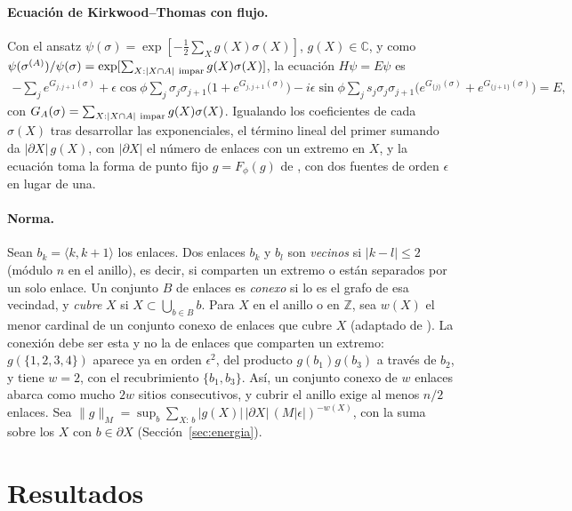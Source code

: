 \documentclass[11pt,a4paper]{article}
\theoremstyle{remark}
\begin{document}
\paragraph{Ecuación de Kirkwood--Thomas con flujo.} Con el ansatz
$\psi(\sigma)=\exp[-\tfrac12\sum_Xg(X)\sigma(X)]$, $g(X)\in\mathbb C$, y como
$\psi(\sigma^{(A)})/\psi(\sigma)=\exp[\sum_{X:|X\cap A|\ \rm impar}g(X)\sigma(X)]$, la ecuación
$H\psi=E\psi$ es
\begin{multline}\label{eq:kt}
  -\sum_je^{G_{j,j+1}(\sigma)}+\epsilon\cos\phi\sum_j\sigma_j\sigma_{j+1}\big(1+e^{G_{j,j+1}(\sigma)}\big)
  -i\epsilon\sin\phi\sum_js_j\sigma_j\sigma_{j+1}\big(e^{G_{\{j\}}(\sigma)}+e^{G_{\{j+1\}}(\sigma)}\big)=E,
\end{multline}
con $G_A(\sigma)=\sum_{X:|X\cap A|\ \rm impar}g(X)\sigma(X)$. Igualando los coeficientes de cada
$\sigma(X)$ tras desarrollar las exponenciales, el término lineal del primer sumando da
$|\partial X|\,g(X)$, con $|\partial X|$ el número de enlaces con un extremo en $X$, y la ecuación
toma la forma de punto fijo $g=F_\phi(g)$ de \cite{dk-kink}, con dos fuentes de orden $\epsilon$ en
lugar de una.

\paragraph{Norma.} Sean $b_k=\langle k,k{+}1\rangle$ los enlaces. Dos enlaces $b_k$ y $b_l$ son
\emph{vecinos} si $|k-l|\le2$ (módulo $n$ en el anillo), es decir, si comparten un extremo o están
separados por un solo enlace. Un conjunto $B$ de enlaces es \emph{conexo} si lo es el grafo de esa
vecindad, y \emph{cubre} $X$ si $X\subset\bigcup_{b\in B}b$. Para $X$ en el anillo o en $\mathbb Z$, sea
$w(X)$ el menor cardinal de un conjunto conexo de enlaces que cubre $X$ (adaptado de \cite{dk-kink}). La conexión
debe ser esta y no la de enlaces que comparten un extremo: $g(\{1,2,3,4\})$ aparece ya en orden
$\epsilon^2$, del producto $g(b_1)g(b_3)$ a través de $b_2$, y tiene $w=2$, con el recubrimiento
$\{b_1,b_3\}$. Así, un conjunto conexo de $w$ enlaces abarca como mucho $2w$ sitios consecutivos, y
cubrir el anillo exige al menos $n/2$ enlaces. Sea
$\|g\|_M=\sup_b\sum_{X:\,b}|g(X)|\,|\partial X|\,(M|\epsilon|)^{-w(X)}$, con la suma sobre los $X$
con $b\in\partial X$ (Sección~\ref{sec:energia}).

\section{Resultados}\label{sec:resultados}
\end{document}
